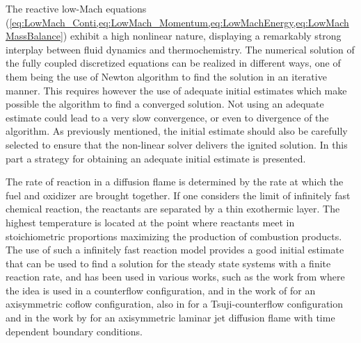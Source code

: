 The reactive low-Mach equations (\cref{eq:LowMach_Conti,eq:LowMach_Momentum,eq:LowMachEnergy,eq:LowMachMassBalance}) exhibit a high nonlinear nature, displaying a remarkably strong interplay between fluid dynamics and thermochemistry. The numerical solution of the fully coupled discretized equations can be realized in different ways, one of them being the use of Newton algorithm to find the solution in an iterative manner. This requires however the use of adequate initial estimates which make possible the algorithm to find a converged solution. Not using an adequate estimate could lead to a very slow convergence, or even to divergence of the algorithm. As previously mentioned, the initial estimate should also be carefully selected to ensure that the non-linear solver delivers the ignited solution. In this part a strategy for obtaining an adequate initial estimate is presented.

The rate of reaction in a diffusion flame is determined by the rate at which the fuel and oxidizer are brought together. If one considers the limit of infinitely fast chemical reaction, the reactants are separated by a thin exothermic layer. The highest temperature is located at the point where reactants meet in stoichiometric proportions maximizing the production of combustion products. The use of such a infinitely fast reaction model provides a good initial estimate that can be used to find a solution for the steady state systems with a finite reaction rate, and has been used in various works, such as the work from \textcite{keyesFlameSheetStarting1987} where the idea is used in a counterflow configuration, and in the work of \textcite{smookeNumericalSolutionTwoDimensional1986} for an axisymmetric coflow configuration, 
also in \textcite{smookeNumericalModelingAxisymmetric1992} for a Tsuji-counterflow configuration and in the work by  \textcite{dobbinsFullyImplicitCompact2010} for an axisymmetric laminar jet diffusion flame with time dependent boundary conditions.


